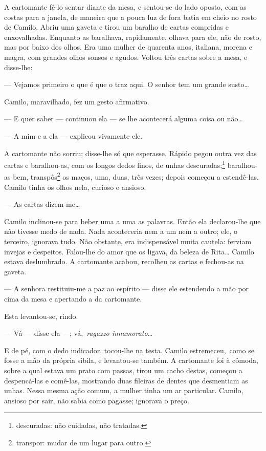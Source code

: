 A cartomante fê-lo sentar diante da mesa, e sentou-se do lado oposto,
com as costas para a janela, de maneira que a pouca luz de fora batia em
cheio no rosto de Camilo. Abriu uma gaveta e tirou um baralho de cartas
compridas e enxovalhadas. Enquanto as baralhava, rapidamente, olhava
para ele, não de rosto, mas por baixo dos olhos. Era uma mulher de
quarenta anos, italiana, morena e magra, com grandes olhos sonsos e
agudos. Voltou três cartas sobre a mesa, e disse-lhe:

--- Vejamos primeiro o que é que o traz aqui. O senhor tem um grande
susto\ldots{}

Camilo, maravilhado, fez um gesto afirmativo.

--- E quer saber --- continuou ela --- se lhe acontecerá alguma coisa ou
não\ldots{}

--- A mim e a ela --- explicou vivamente ele.

A cartomante não sorriu; disse-lhe só que esperasse. Rápido pegou outra
vez das cartas e baralhou-as, com os longos dedos finos, de unhas
descuradas;\footnote{descuradas: não cuidadas, não tratadas.}
baralhou-as bem, transpôs\footnote{transpor: mudar de um lugar para
  outro.} os maços, uma, duas, três vezes; depois começou a estendê-las.
Camilo tinha os olhos nela, curioso e ansioso.

--- As cartas dizem-me\ldots{}

Camilo inclinou-se para beber uma a uma as palavras. Então ela
declarou-lhe que não tivesse medo de nada. Nada aconteceria nem a um nem
a outro; ele, o terceiro, ignorava tudo. Não obstante, era indispensável
muita cautela: ferviam invejas e despeitos. Falou-lhe do amor que os
ligava, da beleza de Rita\ldots{} Camilo estava deslumbrado. A
cartomante acabou, recolheu as cartas e fechou-as na gaveta.

--- A senhora restituiu-me a paz ao espírito --- disse ele estendendo a
mão por cima da mesa e apertando a da cartomante.

Esta levantou-se, rindo.

--- Vá --- disse ela ---; vá,~\emph{ragazzo innamorato}\ldots{}

E de pé, com o dedo indicador, tocou-lhe na testa. Camilo
estremeceu,~como se fosse a mão da própria sibila, e levantou-se também.
A cartomante foi à cômoda, sobre a qual estava um prato com passas,
tirou um cacho destas, começou a despencá-las e comê-las, mostrando duas
fileiras de dentes que desmentiam as unhas. Nessa mesma ação comum, a
mulher tinha um ar particular. Camilo, ansioso por sair, não sabia como
pagasse; ignorava o preço.

